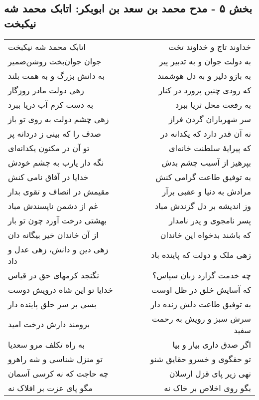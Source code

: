 \begin{center}
\section*{بخش ۵ - مدح محمد بن سعد بن ابوبکر: اتابک محمد شه نیکبخت}
\label{sec:005}
\begin{longtable}{l p{0.5cm} r}
اتابک محمد شه نیکبخت
&&
خداوند تاج و خداوند تخت
\\
جوان جوان‌بخت روشن‌ضمیر
&&
به دولت جوان و به تدبیر پیر
\\
به دانش بزرگ و به همت بلند
&&
به بازو دلیر و به دل هوشمند
\\
زهی دولت مادر روزگار
&&
که رودی چنین پرورد در کنار
\\
به دست کرم آب دریا ببرد
&&
به رفعت محل ثریا ببرد
\\
زهی چشم دولت به روی تو باز
&&
سر شهریاران گردن فراز
\\
صدف را که بینی ز دردانه پر
&&
نه آن قدر دارد که یکدانه در
\\
تو آن در مکنون یکدانه‌ای
&&
که پیرایهٔ سلطنت خانه‌ای
\\
نگه دار یارب به چشم خودش
&&
بپرهیز از آسیب چشم بدش
\\
خدایا در آفاق نامی کنش
&&
به توفیق طاعت گرامی کنش
\\
مقیمش در انصاف و تقوی بدار
&&
مرادش به دنیا و عقبی برآر
\\
غم از دشمن ناپسندش مباد
&&
وز اندیشه بر دل گزندش مباد
\\
بهشتی درخت آورد چون تو بار
&&
پسر نامجوی و پدر نامدار
\\
از آن خاندان خیر بیگانه دان
&&
که باشند بدخواه این خاندان
\\
زهی دین و دانش، زهی عدل و داد
&&
زهی ملک و دولت که پاینده باد
\\
نگنجد کرمهای حق در قیاس
&&
چه خدمت گزارد زبان سپاس؟
\\
خدایا تو این شاه درویش دوست
&&
که آسایش خلق در ظل اوست
\\
بسی بر سر خلق پاینده دار
&&
به توفیق طاعت دلش زنده دار
\\
برومند دارش درخت امید
&&
سرش سبز و رویش به رحمت سفید
\\
به راه تکلف مرو سعدیا
&&
اگر صدق داری بیار و بیا
\\
تو منزل شناسی و شه راهرو
&&
تو حقگوی و خسرو حقایق شنو
\\
چه حاجت که نه کرسی آسمان
&&
نهی زیر پای قزل ارسلان
\\
مگو پای عزت بر افلاک نه
&&
بگو روی اخلاص بر خاک نه
\\

\end{longtable}
\end{center}
